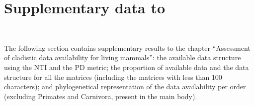 %
%

\chapter{Supplementary data to }
\label{chap:Appendix_missing_mammals}

\bigskip
\medskip
\begin{center}

 \\

\bigskip

\end{center}
%
%
The following section contains supplementary results to the chapter ``Assessment of cladistic data availability for living mammals'': the available data structure using the NTI and the PD metric; the proportion of available data and the data structure for all the matrices (including the matrices with less than 100 characters); and phylogenetical representation of the data availability per order (excluding Primates and Carnivora, present in the main body).




